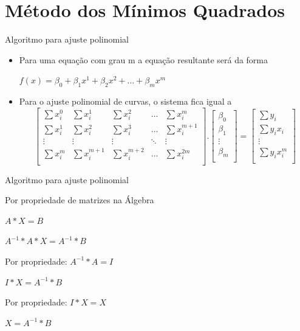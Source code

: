 \documentclass[10pt]{beamer}
\begin{document}
\section{Método dos Mínimos Quadrados}
\begin{frame}[fragile]{Algoritmo para ajuste polinomial}
  \begin{itemize}
  \item Para uma equação com grau m a equação resultante será da forma  \begin{center}$f(x) = \beta_0 + \beta_1x^{1} + \beta_2x^{2} + \dots + \beta_mx^{m}$\newline\end{center}
  
  \item Para o ajuste polinomial de curvas, o sistema fica
igual a   
  \newline
  \[
    \begin{bmatrix}
      \sum{x_{i}^{0}} & \sum{x_{i}^{1}} & \sum{x_{i}^{2}} & \dots  & \sum{x_{i}^{m}} \\
      \sum{x_{i}^{1}} & \sum{x_{i}^{2}} & \sum{x_{i}^{3}} & \dots & \sum{x_{i}^{m+1}}\\
      \vdots & \vdots & \vdots & \ddots & \vdots \\
      \sum{x_{i}^{m}} & \sum{x_{i}^{m+1}} & \sum{x_{i}^{m+2}} & \dots  & \sum{x_{i}^{2m}} \\
    \end{bmatrix}
    .
    \begin{bmatrix}
      \beta_0 \\
      \beta_1 \\
      \vdots  \\
      \beta_m \\
    \end{bmatrix}
    =
    \begin{bmatrix}
      \sum{y_{i}} \\
      \sum{y_{i}x_{i}}\\
      \vdots \\
      \sum{y_{i}x_{i}^{m}} \\
    \end{bmatrix}
  \]
  \newline
  \end{itemize}
\end{frame}


\begin{frame}[fragile]{Algoritmo para ajuste polinomial}
  
  Por propriedade de matrizes na Álgebra 

  
  {\centering
     $A * X = B$\par
     $A^{-1} * A * X = A^{-1} * B$\par
     Por propriedade: $A^{-1} * A = I$\par
     $I * X = A^{-1} * B$\par
     Por propriedade: $I * X = X$\par
     $X = A^{-1} * B$\par
  }

\end{frame}
\end{document}
